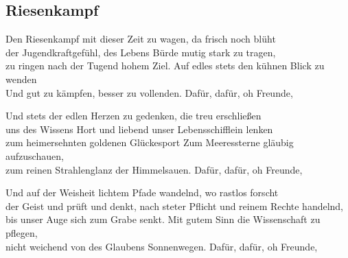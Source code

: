 
\subsection*{Riesenkampf}
%
%

\thestrophe Den Riesenkampf mit dieser Zeit zu wagen, da frisch noch blüht \\
der Jugendkraftgefühl, des Lebens Bürde mutig stark zu tragen, \\
zu ringen nach der Tugend hohem Ziel. Auf edles stets den kühnen Blick zu wenden \\
Und gut zu kämpfen, besser zu vollenden. Dafür, dafür, oh Freunde, \\

\thestrophe Und stets der edlen Herzen zu gedenken, die treu erschließen \\
uns des Wissens Hort und liebend unser Lebensschifflein lenken \\
zum heimersehnten goldenen Glückesport Zum Meeressterne gläubig aufzuschauen, \\
zum reinen Strahlenglanz der Himmelsauen. Dafür, dafür, oh Freunde, \\ 

\thestrophe Und auf der Weisheit lichtem Pfade wandelnd, wo rastlos forscht \\ 
der Geist und prüft und denkt, nach steter Pflicht und reinem Rechte handelnd, \\
bis unser Auge sich zum Grabe senkt. Mit gutem Sinn die Wissenschaft zu pflegen, \\
nicht weichend von des Glaubens Sonnenwegen. Dafür, dafür, oh Freunde, \\
